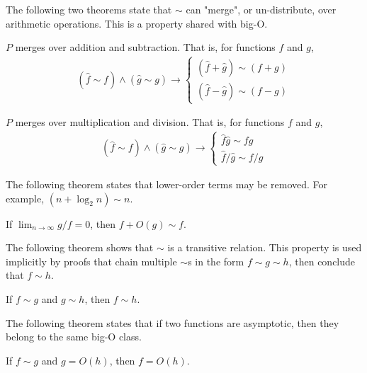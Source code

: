 The following two theorems state that $\sim$ can "merge", or un-distribute, over arithmetic operations. This is a property shared with big-O.

\begin{theorem}
\label{thm:MergesOverArithmeticAdd}
	$P$ merges over addition and subtraction. That is, for functions $f$ and $g$,
	\begin{align*}
	(\hat{f} \sim f) \land (\hat{g} \sim g) \rightarrow \begin{cases}
		(\hat{f} + \hat{g}) \sim (f + g)\\
		(\hat{f} - \hat{g}) \sim (f - g)
	\end{cases}
	\end{align*}
\end{theorem}

\begin{theorem}
\label{thm:MergesOverArithmeticMultiply}
	$P$ merges over multiplication and division. That is, for functions $f$ and $g$,
	\begin{align*}
	(\hat{f} \sim f) \land (\hat{g} \sim g) \rightarrow \begin{cases}
	\hat{f}\hat{g} \sim fg\\
	\hat{f} / \hat{g} \sim f / g
	\end{cases}
	\end{align*}
\end{theorem}

The following theorem states that lower-order terms may be removed. For example, $(n + \log_2 n) \sim n$.

\begin{theorem}
\label{thm:RemovesLowerOrderTerms}
	If $\lim_{n \to \infty} g / f = 0$, then $f + O(g) \sim f$.
\end{theorem}

The following theorem shows that $\sim$ is a transitive relation. This property is used implicitly by proofs that chain multiple $\sim$s in the form $f \sim g \sim h$, then conclude that $f \sim h$.

\begin{theorem}
\label{thm:Transitivity}
	If $f \sim g$ and $g \sim h$, then $f \sim h$.
\end{theorem}

The following theorem states that if two functions are asymptotic, then they belong to the same big-O class.

\begin{theorem}
\label{thm:SameBigOClass}
	If $f \sim g$ and $g = O(h)$, then $f = O(h)$.
\end{theorem}